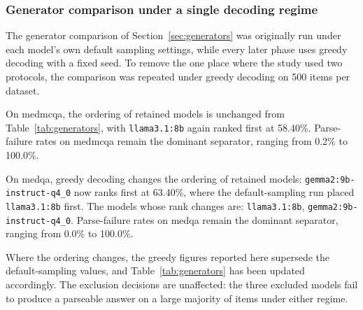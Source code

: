 \subsubsection{Generator comparison under a single decoding regime}
\label{sec:phase2-greedy}

The generator comparison of Section~\ref{sec:generators} was originally run under each model's own default sampling settings, while every later phase uses greedy decoding with a fixed seed. To remove the one place where the study used two protocols, the comparison was repeated under greedy decoding on 500 items per dataset.

On medmcqa, the ordering of retained models is unchanged from Table~\ref{tab:generators}, with \texttt{llama3.1:8b} again ranked first at 58.40\%.
Parse-failure rates on medmcqa remain the dominant separator, ranging from 0.2\% to 100.0\%.

On medqa, greedy decoding changes the ordering of retained models: \texttt{gemma2:9b-instruct-q4\_0} now ranks first at 63.40\%, where the default-sampling run placed \texttt{llama3.1:8b} first. The models whose rank changes are: \texttt{llama3.1:8b}, \texttt{gemma2:9b-instruct-q4\_0}.
Parse-failure rates on medqa remain the dominant separator, ranging from 0.0\% to 100.0\%.

Where the ordering changes, the greedy figures reported here supersede the default-sampling values, and Table~\ref{tab:generators} has been updated accordingly. The exclusion decisions are unaffected: the three excluded models fail to produce a parseable answer on a large majority of items under either regime.
